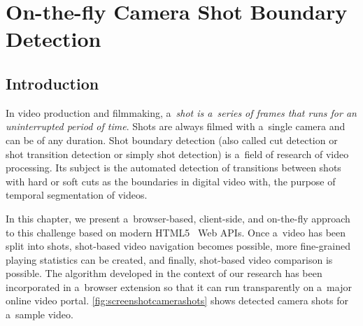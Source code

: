 \chapter{On-the-fly Camera Shot Boundary Detection}
\label{cha:shot-boundary-detection}

\ifpdf
    \graphicspath{{6_shot_boundary_detection/figures/PNG/}{6_shot_boundary_detection/figures/PDF/}{6_shot_boundary_detection/figures/}}
\else
    \graphicspath{{6_shot_boundary_detection/figures/EPS/}{6_shot_boundary_detection/figures/}}
\fi

\section{Introduction} \label{sec:videoshotboundarydetection}

In video production and filmmaking, a~\emph{shot is a~series of frames
that runs for an uninterrupted period of time}.
Shots are always filmed with a~single camera and can be of any duration. 
Shot boundary detection (also called cut detection or shot transition detection
or simply shot detection) is a~field of research of video processing.
Its subject is the automated detection of transitions between shots
with hard or soft cuts as the boundaries
in digital video with, the purpose of temporal segmentation of videos.

In this chapter, we present a~browser-based, client-side, and
on-the-fly approach to this challenge
based on modern HTML5~\cite{berjon2012html5} Web APIs.
Once a~video has been split into shots,
shot-based video navigation becomes possible,
more fine-grained playing statistics can be created,
and finally, shot-based video comparison is possible.
The algorithm developed in the context of our research
has been incorporated in a~browser extension
so that it can run transparently on a~major online video portal.
\autoref{fig:screenshotcamerashots} shows detected camera
shots for a~sample video.

